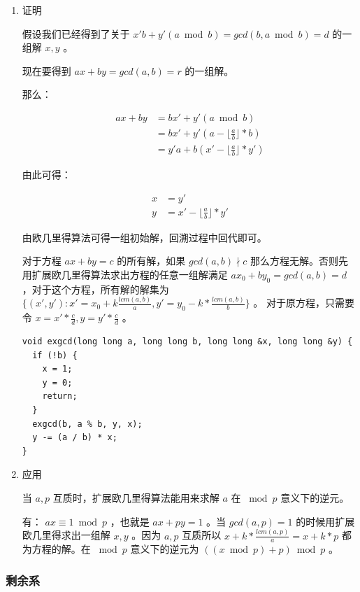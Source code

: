 \documentclass[11pt]{article}
\begin{document}
\begin{enumerate}
\item 证明
\label{sec-3-3-3-1}

假设我们已经得到了关于 $x'b+y'(a \bmod b)=gcd(b,a \bmod b)=d$ 的一组解 $x,y$ 。

现在要得到 $ax+by=gcd(a,b)=r$ 的一组解。

那么：

$$ \begin{aligned}
a x + b y &= b x' + y' (a \bmod b)\\
&= bx' + y'(a - \lfloor \frac{a}{b} \rfloor * b) \\
&= y'a + b(x' - \lfloor \frac{a}{b} \rfloor*y')
\end{aligned} $$

由此可得：

$$ \begin{aligned}
x &= y'\\
y &= x' - \lfloor \frac{a}{b} \rfloor * y'
\end{aligned} $$

由欧几里得算法可得一组初始解，回溯过程中回代即可。

对于方程 $ax+by=c$ 的所有解，如果 $gcd(a,b) \nmid c$ 那么方程无解。否则先用扩展欧几里得算法求出方程的任意一组解满足 $ax_0+by_0=gcd(a,b)=d$  ，对于这个方程，所有解的解集为 
$\{(x',y'): x' = x_0 + k \frac{lcm(a,b)}{a}, y'=y_0-k*\frac{lcm(a,b)}{b}\}$ 。 对于原方程，只需要令 $x=x'*\frac{c}{d},y=y'*\frac{c}{d}$ 。 

\begin{verbatim}
void exgcd(long long a, long long b, long long &x, long long &y) {
  if (!b) {
    x = 1;
    y = 0;
    return;
  }
  exgcd(b, a % b, y, x);
  y -= (a / b) * x;
}
\end{verbatim}

\item 应用
\label{sec-3-3-3-2}

当 $a, p$ 互质时，扩展欧几里得算法能用来求解 $a$ 在 $\bmod p$ 意义下的逆元。

有： $ax \equiv 1 \bmod p$  ，也就是 $ax + py = 1$  。当 $gcd(a,p)=1$ 的时候用扩展欧几里得求出一组解 $x,y$  。因为 $a,p$ 互质所以 $x+k* \frac{lcm(a,p)}{a} = x + k * p$ 都为方程的解。在 $\bmod p$ 意义下的逆元为 $((x \bmod p) + p) \bmod p$  。
\end{enumerate}

\subsubsection{剩余系}
\label{sec-3-3-4}
\end{document}

